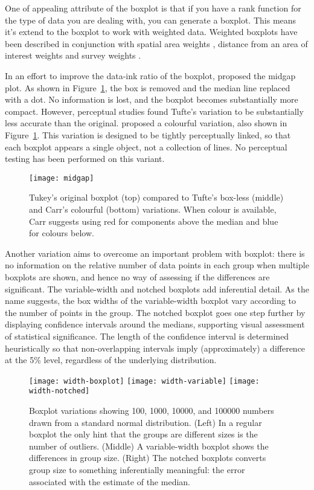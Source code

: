 \documentclass[oneside]{article}
\begin{document}
One of appealing attribute of the boxplot is that if you have a rank function for the type of data you are dealing with, you can generate a boxplot. This means it's extend to the boxplot to work with weighted data. Weighted boxplots have been described in conjunction with spatial area weights \citep{willmott:2007}, distance from an area of interest weights \citep{dykes:2007} and survey weights \citep{survey,korn:1998}.


In an effort to improve the data-ink ratio of the boxplot, \citet{tufte} proposed the midgap plot. As shown in Figure~\ref{fig:tufte}, the box is removed and the median line replaced with a dot. No information is lost, and the boxplot becomes substantially more compact. However, perceptual studies \citep{stock:1991} found Tufte's variation to be substantially less accurate than the original. \citet{carr:1994a} proposed a colourful variation, also shown in Figure~\ref{fig:tufte}. This variation is designed to be tightly perceptually linked, so that each boxplot appears a single object, not a collection of lines. No perceptual testing has been performed on this variant.

\begin{figure}[htbp]
  \centering
  \texttt{[image: midgap]}
  \caption{Tukey's original boxplot (top) compared to Tufte's box-less (middle) and Carr's colourful (bottom) variations. When colour is available, Carr suggests using red for components above the median and blue for colours below.}
  \label{fig:tufte}
\end{figure}

Another variation aims to overcome an important problem with boxplot: there is no information on the relative number of data points in each group when multiple boxplots are shown, and hence no way of assessing if the differences are significant. The variable-width and notched boxplots \citep{varistomd} add inferential detail. As the name suggests, the box widths of the variable-width boxplot vary according to the number of points in the group. The notched boxplot goes one step further by displaying confidence intervals around the medians, supporting visual assessment of statistical significance. The length of the confidence interval is determined heuristically so that non-overlapping intervals imply (approximately) a difference at the 5\% level, regardless of the underlying distribution.

\begin{figure}[htbp]
  \centering
  \texttt{[image: width-boxplot]}%
  \texttt{[image: width-variable]}%
  \texttt{[image: width-notched]}
  \caption{Boxplot variations showing 100, 1000, 10000, and 100000 numbers drawn from a standard normal distribution.  (Left) In a regular boxplot the only hint that the groups are different sizes is the number of outliers. (Middle) A variable-width boxplot shows the differences in group size.  (Right) The notched boxplots converts group size to something inferentially meaningful: the error associated with the estimate of the median.}
  \label{fig:width}
\end{figure}
\end{document}
